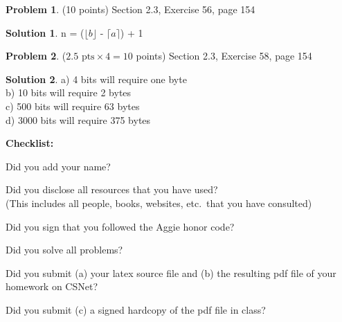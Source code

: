 \documentclass{article}
\theoremstyle{definition}
\newtheorem{problem}{Problem}
\newtheorem*{solution}{Solution}
\newcommand{\checklist}{\noindent\textbf{Checklist:}
\begin{compactenum}
\item Did you add your name? 
\item Did you disclose all resources that you have used? \\
(This includes all people, books, websites, etc.\ that you have consulted)
\item Did you sign that you followed the Aggie honor code? 
\item Did you solve all problems? 
\item Did you submit (a) your latex source file and (b) the resulting pdf file
  of your homework on CSNet?
\item Did you submit (c) a signed hardcopy of the pdf file in class? 
\end{compactenum}
}
\begin{document}
\begin{problem} (10 points)
Section 2.3, Exercise 56, page 154
\end{problem}
\begin{solution} 
n = ($\lfloor b \rfloor$ - $\lceil a \rceil$) + 1
\end{solution}

\begin{problem} ($2.5 \mbox{ pts} \times 4 = 10$ points)
Section 2.3, Exercise 58, page 154
\end{problem}
\begin{solution} 
a) 4 bits will require one byte
\\b) 10 bits will require 2 bytes
\\c) 500 bits will require 63 bytes
\\d) 3000 bits will require 375 bytes
\end{solution}

\goodbreak
\checklist
\end{document}

